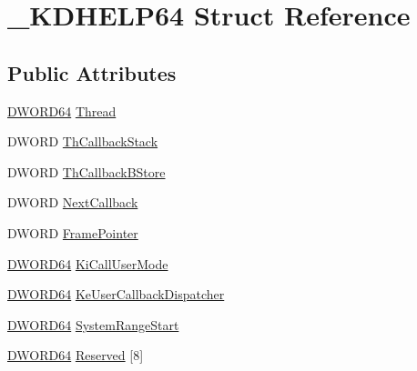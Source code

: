 \hypertarget{struct___k_d_h_e_l_p64}{\section{\-\_\-\-K\-D\-H\-E\-L\-P64 Struct Reference}
\label{struct___k_d_h_e_l_p64}
}
\subsection*{Public Attributes}
\begin{DoxyCompactItemize}
\item 
\hyperlink{_stack_walker_8h_a97fb241c597b99bcb965858f53cacac4}{D\-W\-O\-R\-D64} \hyperlink{struct___k_d_h_e_l_p64_ad54883742842530e7313e9232ab58693}{Thread}
\item 
D\-W\-O\-R\-D \hyperlink{struct___k_d_h_e_l_p64_a2960c0312baa12750404454f5a550930}{Th\-Callback\-Stack}
\item 
D\-W\-O\-R\-D \hyperlink{struct___k_d_h_e_l_p64_a2627f807de1ce437da69006f3f827e11}{Th\-Callback\-B\-Store}
\item 
D\-W\-O\-R\-D \hyperlink{struct___k_d_h_e_l_p64_a9bcc8fa46446b19a8aa5a03d6085baa9}{Next\-Callback}
\item 
D\-W\-O\-R\-D \hyperlink{struct___k_d_h_e_l_p64_a9788c04d5d3fb25ba8b38542fd2f667b}{Frame\-Pointer}
\item 
\hyperlink{_stack_walker_8h_a97fb241c597b99bcb965858f53cacac4}{D\-W\-O\-R\-D64} \hyperlink{struct___k_d_h_e_l_p64_a7844c9d3f429c7b4c292083ae27a8beb}{Ki\-Call\-User\-Mode}
\item 
\hyperlink{_stack_walker_8h_a97fb241c597b99bcb965858f53cacac4}{D\-W\-O\-R\-D64} \hyperlink{struct___k_d_h_e_l_p64_a9dd85a34d6bc9900f6f46a95fef1d6a9}{Ke\-User\-Callback\-Dispatcher}
\item 
\hyperlink{_stack_walker_8h_a97fb241c597b99bcb965858f53cacac4}{D\-W\-O\-R\-D64} \hyperlink{struct___k_d_h_e_l_p64_a631c21491404182176adfecb74acd939}{System\-Range\-Start}
\item 
\hyperlink{_stack_walker_8h_a97fb241c597b99bcb965858f53cacac4}{D\-W\-O\-R\-D64} \hyperlink{struct___k_d_h_e_l_p64_add616dfa495e3dbbbaa828d104e76011}{Reserved} \mbox{[}8\mbox{]}
\end{DoxyCompactItemize}


